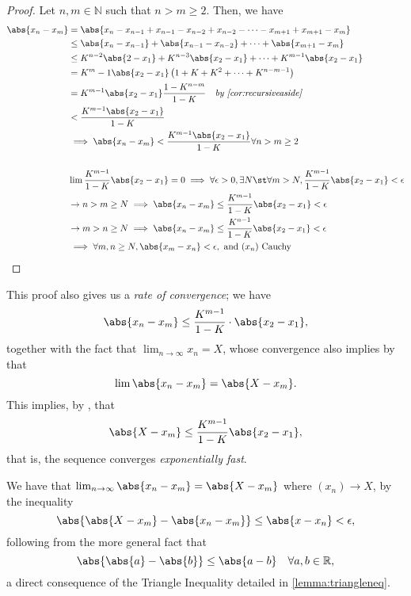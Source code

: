 \documentclass[12pt]{article}
\begin{document}
\begin{proof}
  Let $n,m \in \mathbb{N}$ such that $n > m \geq 2$. Then, we have \begin{align*}
    \abs{x_n - x_m} &= \abs{x_n - x_{n-1} + x_{n-1} - x_{n-2} +x_{n-2} - \cdots  - x_{m+1} + x_{m+1} - x_m}\\
    &\leq \abs{x_n - x_{n-1}} + \abs{x_{n-1} - x_{n-2}} + \cdots + \abs{x_{m+1} - x_m}\\
    &\leq K^{n-2} \abs{2 - x_1} + K^{n-3} \abs{x_2 -x_1} + \cdots + K^{m-1} \abs{x_2 - x_1}\\
    &= K^m-1\abs{x_2 - x_1} \left(1 + K + K^2 + \cdots + K^{n-m-1}\right)\\
    &= K^{m-1}\abs{x_2 - x_1} \frac{1-K^{n-m}}{1-K} \quad \textit{by \cref{cor:recursiveaside}}\\
    &< \frac{K^{m-1}\abs{x_2 - x_1}}{1-K}\\
   &\implies \abs{x_n - x_m} < \frac{K^{m-1}\abs{x_2 - x_1}}{1 - K} \forall n > m \geq 2\\\\
   &\lim \frac{K^{m-1}}{1-K}\abs{x_2 - x_1} = 0 \implies \forall \epsilon > 0, \exists N \st \forall m > N, \frac{K^{m-1}}{1-K}\abs{x_2 - x_1} < \epsilon\\
    & \rightarrow n > m \geq N \implies \abs{x_n - x_m} \leq \frac{K^{m-1}}{1-K} \abs{x_2 - x_1} < \epsilon\\
    & \rightarrow m > n \geq N \implies \abs{x_n - x_m} \leq \frac{K^{n-1}}{1-K} \abs{x_2 - x_1} < \epsilon\\
    &\implies \forall m, n \geq N, \abs{x_m - x_n} < \epsilon, \text{ and } (x_n) \text{ Cauchy}
  \end{align*}
\end{proof}
\begin{remark}
  This proof also gives us a \emph{rate of convergence}; we have
  \[\abs{x_n - x_m} \leq \frac{K^{m-1}}{1-K} \cdot \abs{x_2 - x_1},\] together with the fact that $\lim_{n\to\infty} x_n = X$, whose convergence also implies by  that \[\lim \abs{x_n - x_m} = \abs{X - x_m}.\] This implies, by , that \[
  \abs{X - x_m} \leq \frac{K^{m-1}}{1-K} \abs{x_2 - x_1},
  \]
  that is, the sequence converges \emph{exponentially fast}.
\end{remark}

\begin{remark}
  We have that $\lim_{n\to\infty} \abs{x_n - x_m} = \abs{X - x_m}$ where $(x_n) \to X$, by the inequality \[
    \abs{\abs{X - x_m} - \abs{x_n - x_m}}   \leq \abs{x - x_n} < \epsilon,
  \]
  following from the more general fact that \[
  \abs{\abs{a} - \abs{b}} \leq \abs{a - b} \quad \forall a,b \in \mathbb{R},
  \]
  a direct consequence of the Triangle Inequality detailed in \cref{lemma:triangleneq}.
\end{remark}
\end{document}
